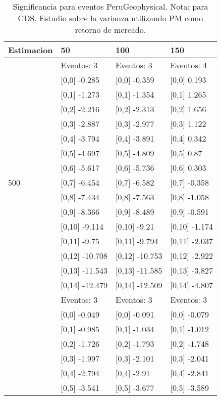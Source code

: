\begin{table}

\caption{Significancia para eventos PeruGeophysical. Nota: para CDS. Estudio sobre la varianza utilizando PM como retorno de mercado.}
\centering
\begin{tabular}[t]{llll}
\toprule
Estimacion & 50 & 100 & 150\\
\midrule
 & Eventos:  3 & Eventos:  3 & Eventos:  4\\
 & {}[0,0] -0.285 & {}[0,0] -0.359 & {}[0,0] 0.193\\
 & {}[0,1] -1.273 & {}[0,1] -1.354 & {}[0,1] 1.265\\
 & {}[0,2] -2.216 & {}[0,2] -2.313 & {}[0,2] 1.656\\
 & {}[0,3] -2.887 & {}[0,3] -2.977 & {}[0,3] 1.122\\
\addlinespace
 & {}[0,4] -3.794 & {}[0,4] -3.891 & {}[0,4] 0.342\\
 & {}[0,5] -4.697 & {}[0,5] -4.809 & {}[0,5] 0.87\\
 & {}[0,6] -5.617 & {}[0,6] -5.736 & {}[0,6] 0.303\\
500 & {}[0,7] -6.454 & {}[0,7] -6.582 & {}[0,7] -0.358\\
 & {}[0,8] -7.434 & {}[0,8] -7.563 & {}[0,8] -1.058\\
\addlinespace
 & {}[0,9] -8.366 & {}[0,9] -8.489 & {}[0,9] -0.591\\
 & {}[0,10] -9.114 & {}[0,10] -9.21 & {}[0,10] -1.174\\
 & {}[0,11] -9.75 & {}[0,11] -9.794 & {}[0,11] -2.037\\
 & {}[0,12] -10.708 & {}[0,12] -10.753 & {}[0,12] -2.922\\
 & {}[0,13] -11.543 & {}[0,13] -11.585 & {}[0,13] -3.827\\
\addlinespace
 & {}[0,14] -12.479 & {}[0,14] -12.509 & {}[0,14] -4.807\\
 & Eventos:  3 & Eventos:  3 & Eventos:  3\\
 & {}[0,0] -0.049 & {}[0,0] -0.091 & {}[0,0] -0.079\\
 & {}[0,1] -0.985 & {}[0,1] -1.034 & {}[0,1] -1.012\\
 & {}[0,2] -1.726 & {}[0,2] -1.793 & {}[0,2] -1.748\\
\addlinespace
 & {}[0,3] -1.997 & {}[0,3] -2.101 & {}[0,3] -2.041\\
 & {}[0,4] -2.794 & {}[0,4] -2.91 & {}[0,4] -2.841\\
 & {}[0,5] -3.541 & {}[0,5] -3.677 & {}[0,5] -3.589\\

\end{tabular}
\end{table}
